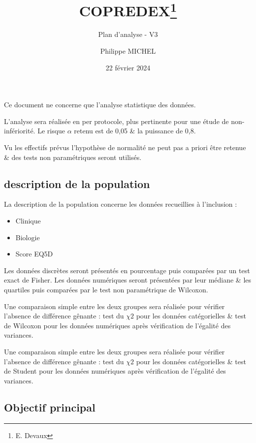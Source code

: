 \documentclass[
]{article}
\title{COPREDEX\thanks{E. Devaux}}
\subtitle{Plan d'analyse - V3}
\author{Philippe MICHEL}
\date{22 février 2024}
\providecommand{\tightlist}{%
  \setlength{\itemsep}{0pt}\setlength{\parskip}{0pt}}
\begin{document}
\maketitle

{
\setcounter{tocdepth}{2}
\tableofcontents
}
Ce document ne concerne que l'analyse statistique des données.

L'analyse sera réalisée en per protocole, plus pertinente pour une étude
de non-infériorité. Le risque \(\alpha\) retenu est de 0,05 \& la
puissance de 0,8.

Vu les effectifs prévus l'hypothèse de normalité ne peut pas a priori
être retenue \& des tests non paramétriques seront utilisés.

\hypertarget{description-de-la-population}{%
\subsection{description de la
population}\label{description-de-la-population}}

La description de la population concerne les données recueillies à
l'inclusion :

\begin{itemize}
\tightlist
\item
  Clinique
\item
  Biologie
\item
  Score EQ5D
\end{itemize}

Les données discrètes seront présentés en pourcentage puis comparées par
un test exact de Fisher. Les données numériques seront présentées par
leur médiane \& les quartiles puis comparées par le test non
paramétrique de Wilcoxon.

Une comparaison simple entre les deux groupes sera réalisée pour
vérifier l'absence de différence gênante : test du \(\chi 2\) pour les
données catégorielles \& test de Wilcoxon pour les données numériques
après vérification de l'égalité des variances.

Une comparaison simple entre les deux groupes sera réalisée pour
vérifier l'absence de différence gênante : test du \(\chi 2\) pour les
données catégorielles \& test de Student pour les données numériques
après vérification de l'égalité des variances.

\hypertarget{objectif-principal}{%
\subsection{Objectif principal}\label{objectif-principal}}
\end{document}
